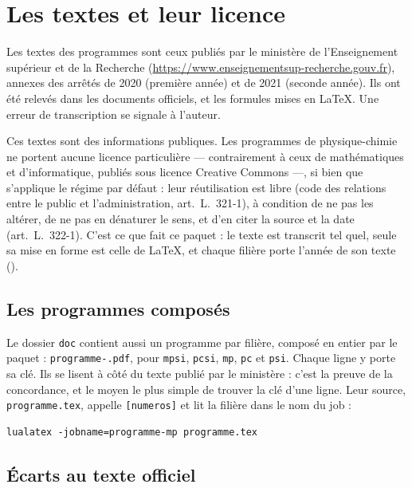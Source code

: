 \documentclass[a4paper,11pt]{article}
\begin{document}
\section{Les textes et leur licence}

Les textes des programmes sont ceux publiés par le ministère de l'Enseignement
supérieur et de la Recherche (\url{https://www.enseignementsup-recherche.gouv.fr}),
annexes des arrêtés de 2020 (première année) et de 2021 (seconde année). Ils
ont été relevés dans les documents officiels, et les formules mises en \LaTeX.
Une erreur de transcription se signale à l'auteur.

Ces textes sont des informations publiques. Les programmes de physique-chimie
ne portent aucune licence particulière --- contrairement à ceux de
mathématiques et d'informatique, publiés sous licence Creative Commons ---, si
bien que s'applique le régime par défaut : leur réutilisation est libre
(code des relations entre le public et l'administration, art.~L.~321-1), à
condition de ne pas les altérer, de ne pas en dénaturer le sens, et d'en citer
la source et la date (art.~L.~322-1). C'est ce que fait ce paquet : le texte est
transcrit tel quel, seule sa mise en forme est celle de \LaTeX, et chaque
filière porte l'année de son texte ().

\subsection*{Les programmes composés}

Le dossier \texttt{doc} contient aussi un programme par filière, composé en
entier par le paquet : \texttt{programme-}\texttt{.pdf}, pour
\texttt{mpsi}, \texttt{pcsi}, \texttt{mp}, \texttt{pc} et \texttt{psi}. Chaque ligne y porte sa clé. Ils se lisent à côté
du texte publié par le ministère : c'est la preuve de la concordance, et le
moyen le plus simple de trouver la clé d'une ligne. Leur source,
\texttt{programme.tex}, appelle \texttt{[numeros]} et lit la
filière dans le nom du job :
\begin{verbatim}
lualatex -jobname=programme-mp programme.tex
\end{verbatim}

\subsection*{Écarts au texte officiel}
\end{document}
